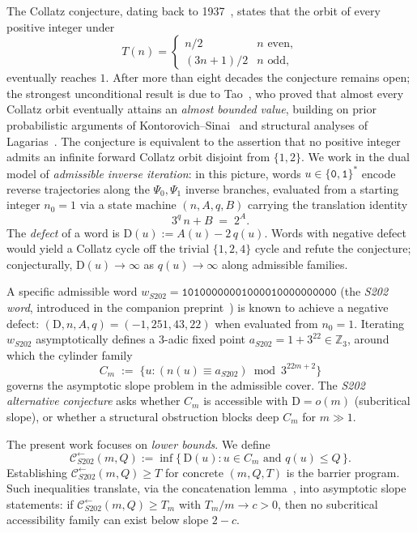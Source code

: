 \documentclass[11pt,a4paper]{article}
\theoremstyle{plain}
\theoremstyle{definition}
\theoremstyle{plain}
\newcommand{\ZZp}[1]{\mathbb{Z}_{#1}}
\newcommand{\Calphax}{\mathcal{C}^{\leftarrow}_{S202}}
\newcommand{\aS}{a_{S202}}
\newcommand{\wS}{w_{S202}}
\newcommand{\defect}{\mathrm{D}}
\begin{document}
The Collatz conjecture, dating back to 1937~\cite{lagarias2010,wirsching}, states that
the orbit of every positive integer under
\[
  T(n) =
    \begin{cases}
       n/2     & n \text{ even},\\
       (3n+1)/2 & n \text{ odd},
    \end{cases}
\]
eventually reaches $1$. After more than eight decades the conjecture
remains open; the strongest unconditional result is due to Tao~\cite{tao2022},
who proved that almost every Collatz orbit eventually attains an
\emph{almost bounded value}, building on prior probabilistic
arguments of Kontorovich--Sinai~\cite{kontorovich2002} and structural
analyses of Lagarias~\cite{lagarias1985}. The conjecture is
equivalent to the assertion that no positive integer admits an
infinite forward Collatz orbit disjoint from $\{1, 2\}$.
We work in the dual model of \emph{admissible inverse iteration}: in
this picture, words $u \in \{\mathtt{0},\mathtt{1}\}^*$ encode reverse
trajectories along the $\Psi_0,\Psi_1$ inverse branches, evaluated
from a starting integer $n_0 = 1$ via a state machine
\((n, A, q, B)\) carrying the translation identity
\[
   3^q\,n + B \;=\; 2^A.
\tag{Inv-Id}\label{eq:invid}
\]
The \emph{defect} of a word is $\defect(u) := A(u) - 2\,q(u)$.
Words with negative defect would yield a Collatz cycle off the trivial
$\{1,2,4\}$ cycle and refute the conjecture; conjecturally,
$\defect(u) \to \infty$ as $q(u) \to \infty$ along admissible
families.

A specific admissible word
$\wS = \mathtt{10100000001000010000000000}$ (the \emph{S202 word},
introduced in the companion preprint~\cite{S202})
is known to achieve a negative defect:
$(\defect, n, A, q) = (-1, 251, 43, 22)$ when evaluated from $n_0 = 1$.
Iterating $\wS$ asymptotically defines a 3-adic fixed point
$\aS = 1 + 3^{22} \in \ZZp{3}$, around which the cylinder family
\[
  C_m \;:=\; \{u : (n(u) \equiv \aS) \bmod 3^{22m+2}\}
\]
governs the asymptotic slope problem in the admissible cover.
The \emph{S202 alternative conjecture} asks whether
$C_m$ is accessible with $\defect = o(m)$ (subcritical slope), or
whether a structural obstruction blocks deep $C_m$ for $m \gg 1$.

The present work focuses on \emph{lower bounds}. We define
\[
  \Calphax(m, Q) :=
  \inf\bigl\{\, \defect(u) : u \in C_m \text{ and } q(u) \le Q\,\bigr\}.
\]
Establishing $\Calphax(m, Q) \ge T$ for concrete $(m, Q, T)$ is the
barrier program. Such inequalities translate, via the
concatenation lemma~\cite{S211}, into asymptotic slope statements:
if $\Calphax(m, Q) \ge T_m$ with $T_m / m \to c > 0$, then no
subcritical accessibility family can exist below slope $2 - c$.
\end{document}
